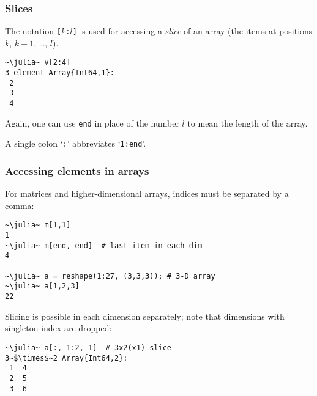 \documentclass[english,serif,mathserif,xcolor=pdftex,dvipsnames,table]{beamer}
\begin{document}
\begin{frame}[fragile]
  \frametitle{Slices}
  The notation \texttt{[$k$:$l$]} is used for accessing a \emph{slice}
  of an array (the items at positions $k$, $k+1$, \ldots, $l$).
\begin{lstlisting}
~\julia~ v[2:4]
3-element Array{Int64,1}:
 2
 3
 4
\end{lstlisting}

  \+ Again, one can use \texttt{end} in place of the number $l$ to
  mean the length of the array.

  \+ A single colon `\texttt{:}' abbreviates `\texttt{1:end}'.
\end{frame}


\begin{frame}[fragile]
  \frametitle{Accessing elements in arrays}
  \smaller
  For matrices and higher-dimensional arrays,
  indices must be separated by a comma:
\begin{lstlisting}
~\julia~ m[1,1]
1
~\julia~ m[end, end]  # last item in each dim
4

~\julia~ a = reshape(1:27, (3,3,3)); # 3-D array
~\julia~ a[1,2,3]
22
\end{lstlisting}

  Slicing is possible in each dimension separately;
  note that dimensions with singleton index are dropped:
\begin{lstlisting}
~\julia~ a[:, 1:2, 1]  # 3x2(x1) slice
3~$\times$~2 Array{Int64,2}:
 1  4
 2  5
 3  6
\end{lstlisting}
\end{frame}
\end{document}
